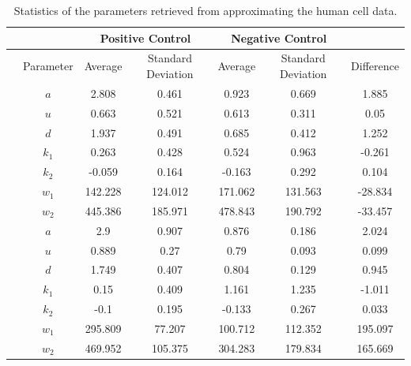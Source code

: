\begin{table}[h!]
	\centering
	\begin{tabular}{|c|c|c|c|c|c|c|}
		\hline
		 & & \multicolumn{2}{|c|}{Positive Control} & \multicolumn{2}{|c|}{Negative Control} & \\ 
		\hline
		& Parameter & Average & Standard Deviation & Average & Standard Deviation & Difference \\ 
		\hline
		\multirow{7}{*}{\rotatebox[origin=c]{90}{human cells}} & $a$ & 2.808 & 0.461 & 0.923 & 0.669 & 1.885\\
		\cline{2-7}
		& $u$ & 0.663 & 0.521 & 0.613 & 0.311 & 0.05\\
		\cline{2-7}
		& $d$ & 1.937 & 0.491 & 0.685 & 0.412 & 1.252\\
		\cline{2-7}
		& $k_1$ & 0.263 & 0.428 & 0.524 & 0.963 & -0.261 \\
		\cline{2-7}
		& $k_2$ & -0.059 & 0.164 & -0.163 & 0.292 & 0.104 \\
		\cline{2-7}
		& $w_1$ & 142.228 & 124.012 & 171.062 & 131.563 & -28.834 \\
		\cline{2-7}
		& $w_2$ & 445.386 & 185.971 & 478.843 & 190.792 & -33.457 \\
		\hline
		\multirow{7}{*}{\rotatebox[origin=c]{90}{mouse cells}} & $a$ & 2.9 & 0.907 & 0.876 & 0.186 & 2.024 \\
		\cline{2-7}
		& $u$ & 0.889 & 0.27 & 0.79 & 0.093 & 0.099 \\
		\cline{2-7}
		& $d$ & 1.749 & 0.407 & 0.804 & 0.129 & 0.945 \\
		\cline{2-7}
		& $k_1$ & 0.15 & 0.409 & 1.161 & 1.235 & -1.011 \\
		\cline{2-7}
		& $k_2$ & -0.1 & 0.195 & -0.133 & 0.267 & 0.033 \\
		\cline{2-7}
		& $w_1$ & 295.809 & 77.207 & 100.712 & 112.352 & 195.097 \\
		\cline{2-7}
		& $w_2$ & 469.952 & 105.375 & 304.283 & 179.834 & 165.669 \\
		\hline
	\end{tabular}
	\caption{Statistics of the parameters retrieved from approximating the human cell data.}
	\label{tab:statistics_parameters}
\end{table}


